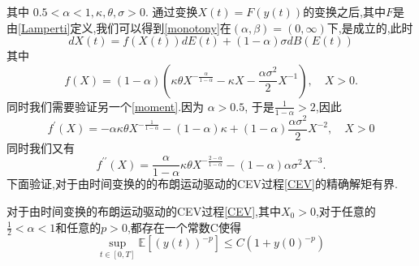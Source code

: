 	其中 $0.5<\alpha<1,\kappa,\theta,\sigma>0.$ 通过变换$X(t)=F(y(t))$的变换之后,其中$F$是由\cref{Lamperti}定义,我们可以得到\cref{monotony}在$(\alpha,\beta)=(0,\infty)$下,是成立的,此时	$$dX(t)=f(X(t))dE(t)+(1-\alpha)\sigma dB(E(t))$$
	其中
	$$f(X)=(1-\alpha)\left(\kappa\theta X^{-\frac\alpha{1-\alpha}}-\kappa X-\frac{\alpha\sigma^2}2X^{-1}\right),\quad X>0.$$
	同时我们需要验证另一个\cref{moment}.因为 $\alpha>0.5$, 于是$\frac{1}{1-\alpha}>2$,因此
	$$f^{\prime}(X)=-\alpha\kappa\theta X^{-\frac1{1-\alpha}}-(1-\alpha)\kappa+(1-\alpha)\frac{\alpha\sigma^2}2X^{-2},\quad X>0$$
	同时我们又有
	$$f^{\prime\prime}(X)=\frac\alpha{1-\alpha}\kappa\theta X^{-\frac{2-\alpha}{1-\alpha}}-(1-\alpha)\alpha\sigma^2X^{-3}.$$
	下面验证,对于由时间变换的的布朗运动驱动的CEV过程\cref{CEV}的精确解矩有界.
	\begin{proposition}
		对于由时间变换的布朗运动驱动的CEV过程\cref{CEV},其中$X_0>0$,对于任意的$\frac{1}{2}<\alpha<1$和任意的$p>0$,都存在一个常数C使得
		\begin{equation*}
			\sup\limits_{t\in[0,T]}\mathbb{E}\left[\left(y(t)\right)^{-p}\right]\leq C(1+y(0)^{-p})
		\end{equation*}
	\end{proposition}

